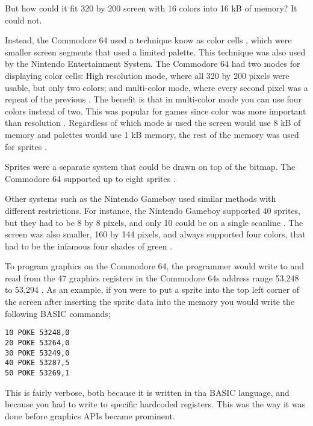 But how could it fit 320 by 200 screen with 16 colors into 16 kB of memory? It could not.

Instead, the Commodore 64 used a technique know as color cells \cite{commodore1983commodore}, which were smaller screen segments that used a limited palette.
This technique was also used by the Nintendo Entertainment System. 
The Commodore 64 had two modes for displaying color cells: High resolution mode, where all 320 by 200 pixels were usable, but only two colors; and multi-color mode, where every second pixel was a repeat of the previous \cite{commodore1983commodore}.
The benefit is that in multi-color mode you can use four colors instead of two.
This was popular for games since color was more important than resolution \cite{bogdan2014games}.
Regardless of which mode is used the screen would use 8 kB of memory and palettes would use 1 kB memory, the rest of the memory was used for sprites \cite{commodore1983commodore}.

Sprites were a separate system that could be drawn on top of the bitmap.
The Commodore 64 supported up to eight sprites \cite{commodore1983commodore}.

Other systems such as the Nintendo Gameboy used similar methods with different restrictions.
For instance, the Nintendo Gameboy supported 40 sprites, but they had to be 8 by 8 pixels, and only 10 could be on a single scanline \cite{nintendo1999gameboy}. 
The screen was also smaller, 160 by 144 pixels, and always supported four colors, that had to be the infamous four shades of green \cite{nintendo1999gameboy}.

To program graphics on the Commodore 64, the programmer would write to and read from the 47 graphics registers in the Commodore 64s address range 53,248 to 53,294 \cite{commodore1983commodore}.
As an example, if you were to put a sprite into the top left corner of the screen after inserting the sprite data into the memory you would write the following BASIC commands; 

\begin{lstlisting}[caption={Small BASIC program that sets the coordinate of sprite 0 to (0,0) (line 1-3), sets the color to green (line 4), and displays it (line 5).}]
10 POKE 53248,0
20 POKE 53264,0
30 POKE 53249,0
40 POKE 53287,5
50 POKE 53269,1
\end{lstlisting}
This is fairly verbose, both because it is written in tha BASIC language, and because you had to write to specific hardcoded registers.
This was the way it was done before graphics \glspl{API} became prominent.

